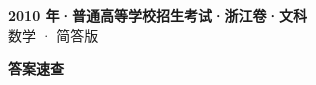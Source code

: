 \documentclass[zihao=-4, a4paper]{ctexart}
\begin{document}
\begin{center}
  {\Large\bfseries 2010 年·普通高等学校招生考试·浙江卷·文科}\\[4pt]
  {\large 数学 · 简答版}
\end{center}
\medskip
{}

\clearpage
{}
\begin{center}{\Large\bfseries 答案速查}\end{center}
\medskip

\end{document}
